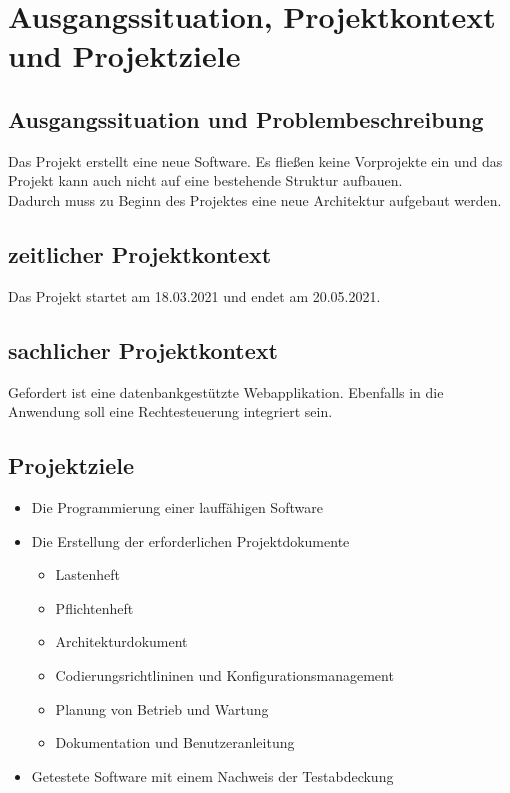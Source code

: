 
\chapter{Ausgangssituation, Projektkontext und Projektziele}

\section{Ausgangssituation und Problembeschreibung}

Das Projekt erstellt eine neue Software. Es fließen keine Vorprojekte ein und das Projekt kann auch nicht auf eine bestehende Struktur aufbauen. \\
Dadurch muss zu Beginn des Projektes eine neue Architektur aufgebaut werden. \\

\section{zeitlicher Projektkontext}

Das Projekt startet am 18.03.2021 und endet am 20.05.2021.

\section{sachlicher Projektkontext}

Gefordert ist eine datenbankgestützte Webapplikation. Ebenfalls in die Anwendung soll eine Rechtesteuerung integriert sein.

\section{Projektziele}

\begin{itemize}
\item Die Programmierung einer lauffähigen Software 
\item Die Erstellung der erforderlichen Projektdokumente
	\begin{itemize}
	\item Lastenheft
	\item Pflichtenheft
	\item Architekturdokument
	\item Codierungsrichtlininen und Konfigurationsmanagement
	\item Planung von Betrieb und Wartung
	\item Dokumentation und Benutzeranleitung
	\end{itemize}
\item Getestete Software mit einem Nachweis der Testabdeckung
\end{itemize}


